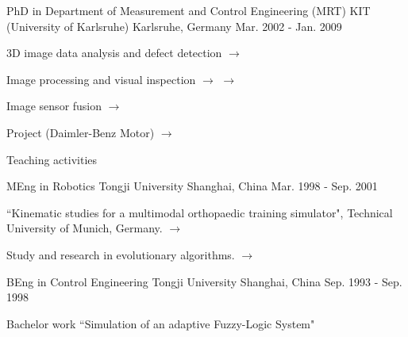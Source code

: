\documentclass[../cv_xin.tex]{subfiles}
\begin{document}
\begin{cventries}
  \cventry
    {PhD in Department of Measurement and Control Engineering (MRT)} %
    {KIT (University of Karlsruhe)} %
    {Karlsruhe, Germany} %
    {Mar. 2002 - Jan. 2009} %
    {
      \begin{cvitems} %
        \item 3D image data analysis and defect detection \hyperlink{xin2008diss}{$\rightarrow$}
        \item Image processing and visual inspection \hyperlink{xin2009multiscale}{$\rightarrow$} \hyperlink{xin2007evaluation}{$\rightarrow$}
        \item Image sensor fusion \hyperlink{xin2004bildfolgenauswertung}{$\rightarrow$}
        \item Project (Daimler-Benz Motor)  \hyperlink{Xin_Daimler_08}{$\rightarrow$}
        \item Teaching activities
      \end{cvitems}
    }

  \cventry
    {MEng in Robotics} %
    {Tongji University} %
    {Shanghai, China} %
    {Mar. 1998 - Sep. 2001} %
    {
      \begin{cvitems} %
        \item ``Kinematic studies for a multimodal orthopaedic training simulator", Technical University of Munich, Germany. \hyperlink{xin2002KneeSimulator}{$\rightarrow$}
        \item Study and research in evolutionary algorithms. \hyperlink{xin2002AntColony}{$\rightarrow$}
      \end{cvitems}
    }

  \cventry
    {BEng in Control Engineering} %
    {Tongji University} %
    {Shanghai, China} %
    {Sep. 1993 - Sep. 1998} %
    {
      \begin{cvitems} %
        \item Bachelor work ``Simulation of an adaptive Fuzzy-Logic System"
      \end{cvitems}
    }

\end{cventries}
\end{document}
